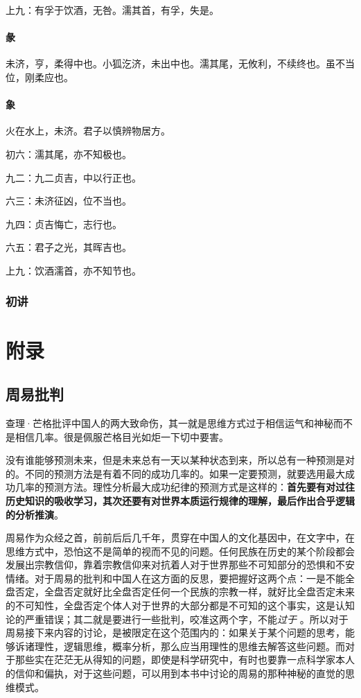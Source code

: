 \documentclass[12pt,oneside]{book}
\begin{document}
上九：有孚于饮酒，无咎。濡其首，有孚，失是。

\subsection{彖}
未济，亨，柔得中也。小狐汔济，未出中也。濡其尾，无攸利，不续终也。虽不当位，刚柔应也。

\subsection{象}
火在水上，未济。君子以慎辨物居方。

初六：濡其尾，亦不知极也。

九二：九二贞吉，中以行正也。

六三：未济征凶，位不当也。

九四：贞吉悔亡，志行也。

六五：君子之光，其晖吉也。

上九：饮酒濡首，亦不知节也。

\section{初讲}








\part{附录}
\chapter{周易批判}
查理·芒格批评中国人的两大致命伤，其一就是思维方式过于相信运气和神秘而不是相信几率。很是佩服芒格目光如炬一下切中要害。

没有谁能够预测未来，但是未来总有一天以某种状态到来，所以总有一种预测是对的。不同的预测方法是有着不同的成功几率的。如果一定要预测，就要选用最大成功几率的预测方法。理性分析最大成功纪律的预测方式是这样的：\textbf{首先要有对过往历史知识的吸收学习，其次还要有对世界本质运行规律的理解，最后作出合乎逻辑的分析推演}。

周易作为众经之首，前前后后几千年，贯穿在中国人的文化基因中，在文字中，在思维方式中，恐怕这不是简单的视而不见的问题。任何民族在历史的某个阶段都会发展出宗教信仰，靠着宗教信仰来对抗着人对于世界那些不可知部分的恐惧和不安情绪。对于周易的批判和中国人在这方面的反思，要把握好这两个点：一是不能全盘否定，全盘否定就好比全盘否定任何一个民族的宗教一样，就好比全盘否定未来的不可知性，全盘否定个体人对于世界的大部分都是不可知的这个事实，这是认知论的严重错误；其二就是要进行一些批判，咬准这两个字，不能\emph{过于} 。所以对于周易接下来内容的讨论，是被限定在这个范围内的：如果关于某个问题的思考，能够诉诸理性，逻辑思维，概率分析，那么应当用理性的思维去解答这些问题。而对于那些实在茫茫无从得知的问题，即使是科学研究中，有时也要靠一点科学家本人的信仰和偏执，对于这些问题，可以用到本书中讨论的周易的那种神秘的直觉的思维模式。
\end{document}
